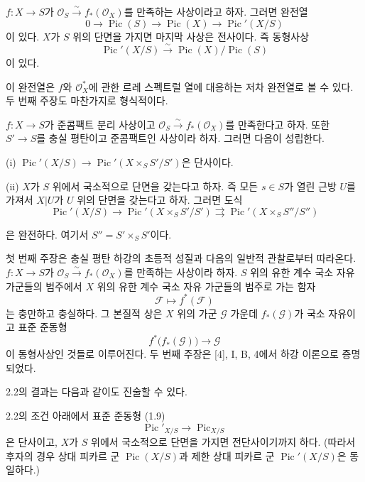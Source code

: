 
 $f:X\longrightarrow S$가
$\mathcal O_S\xrightarrow{\sim}f_*(\mathcal O_X)$를 만족하는 사상이라고
하자. 그러면 완전열
\[
0\longrightarrow\operatorname{Pic}(S)\longrightarrow\operatorname{Pic}(X)
\longrightarrow\operatorname{Pic}'(X/S)
\]
이 있다. $X$가 $S$ 위의 단면을 가지면 마지막 사상은 전사이다. 즉
동형사상
\[
\operatorname{Pic}'(X/S)\xrightarrow{\sim}
\operatorname{Pic}(X)/\operatorname{Pic}(S)
\]
이 있다.

이 완전열은 $f$와 $\mathcal O_X^*$에 관한 르레 스펙트럴 열에 대응하는
저차 완전열로 볼 수 있다. 두 번째 주장도 마찬가지로 형식적이다.

 $f:X\longrightarrow S$가 준콤팩트 분리 사상이고
$\mathcal O_S\xrightarrow{\sim}f_*(\mathcal O_X)$를 만족한다고 하자. 또한
$S'\longrightarrow S$를 충실 평탄이고 준콤팩트인 사상이라 하자. 그러면
다음이 성립한다.

\noindent (i) $\operatorname{Pic}'(X/S)\longrightarrow
\operatorname{Pic}'(X\times_SS'/S')$은 단사이다.

\noindent (ii) $X$가 $S$ 위에서 국소적으로 단면을 갖는다고 하자. 즉 모든
$s\in S$가 열린 근방 $U$를 가져서 $X|U$가 $U$ 위의 단면을 갖는다고
하자. 그러면 도식
\[
\operatorname{Pic}'(X/S)\longrightarrow
\operatorname{Pic}'(X\times_SS'/S')\rightrightarrows
\operatorname{Pic}'(X\times_SS''/S'')
\]

은 완전하다. 여기서 $S''=S'\times_SS'$이다.

첫 번째 주장은 충실 평탄 하강의 초등적 성질과 다음의 일반적 관찰로부터
따라온다. $f:X\longrightarrow S$가
$\mathcal O_S\xrightarrow{\sim}f_*(\mathcal O_X)$를 만족하는 사상이라
하자. $S$ 위의 유한 계수 국소 자유 가군들의 범주에서 $X$ 위의 유한 계수
국소 자유 가군들의 범주로 가는 함자
\[
\mathcal F\longmapsto f^*(\mathcal F)
\]
는 충만하고 충실하다. 그 본질적 상은 $X$ 위의 가군 $\mathcal G$ 가운데
$f_*(\mathcal G)$가 국소 자유이고 표준 준동형
\[
f^*\bigl(f_*(\mathcal G)\bigr)\longrightarrow\mathcal G
\]
이 동형사상인 것들로 이루어진다. 두 번째 주장은 [4], I, B, 4에서 하강
이론으로 증명되었다.

2.2의 결과는 다음과 같이도 진술할 수 있다.

 2.2의 조건 아래에서 표준 준동형 (1.9)
\[
\operatorname{Pic}'_{X/S}\longrightarrow\operatorname{Pic}_{X/S}
\]
은 단사이고, $X$가 $S$ 위에서 국소적으로 단면을 가지면 전단사이기까지
하다. (따라서 후자의 경우 상대 피카르 군 $\operatorname{Pic}(X/S)$과
제한 상대 피카르 군 $\operatorname{Pic}'(X/S)$은 동일하다.)

